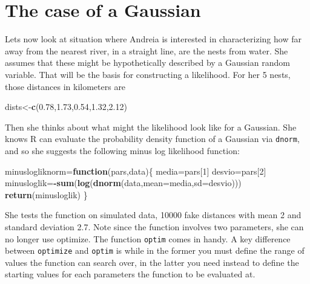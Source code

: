 \documentclass[
]{book}
\newenvironment{Shaded}{\begin{snugshade}}{\end{snugshade}}
\newcommand{\AttributeTok}[1]{\textcolor[rgb]{0.13,0.29,0.53}{#1}}
\newcommand{\ControlFlowTok}[1]{\textcolor[rgb]{0.13,0.29,0.53}{\textbf{#1}}}
\newcommand{\DecValTok}[1]{\textcolor[rgb]{0.00,0.00,0.81}{#1}}
\newcommand{\FloatTok}[1]{\textcolor[rgb]{0.00,0.00,0.81}{#1}}
\newcommand{\FunctionTok}[1]{\textcolor[rgb]{0.13,0.29,0.53}{\textbf{#1}}}
\newcommand{\NormalTok}[1]{#1}
\newcommand{\OtherTok}[1]{\textcolor[rgb]{0.56,0.35,0.01}{#1}}
\newcommand{\SpecialCharTok}[1]{\textcolor[rgb]{0.81,0.36,0.00}{\textbf{#1}}}
\begin{document}
\section{The case of a Gaussian}\label{the-case-of-a-gaussian}

Lets now look at situation where Andreia is interested in characterizing how far away from the nearest river, in a straight line, are the nests from water. She assumes that these might be hypothetically described by a Gaussian random variable. That will be the basis for constructing a likelihood. For her 5 nests, those distances in kilometers are

\begin{Shaded}
\begin{Highlighting}[]
\NormalTok{dists}\OtherTok{\textless{}{-}}\FunctionTok{c}\NormalTok{(}\FloatTok{0.78}\NormalTok{,}\FloatTok{1.73}\NormalTok{,}\FloatTok{0.54}\NormalTok{,}\FloatTok{1.32}\NormalTok{,}\FloatTok{2.12}\NormalTok{)}
\end{Highlighting}
\end{Shaded}

Then she thinks about what might the likelihood look like for a Gaussian. She knows R can evaluate the probability density function of a Gaussian via \texttt{dnorm}, and so she suggests the following minus log likelihood function:

\begin{Shaded}
\begin{Highlighting}[]
\NormalTok{minuslogliknorm}\OtherTok{=}\ControlFlowTok{function}\NormalTok{(pars,data)\{}
\NormalTok{  media}\OtherTok{=}\NormalTok{pars[}\DecValTok{1}\NormalTok{]}
\NormalTok{  desvio}\OtherTok{=}\NormalTok{pars[}\DecValTok{2}\NormalTok{]}
\NormalTok{  minusloglik}\OtherTok{=}\SpecialCharTok{{-}}\FunctionTok{sum}\NormalTok{(}\FunctionTok{log}\NormalTok{(}\FunctionTok{dnorm}\NormalTok{(data,}\AttributeTok{mean=}\NormalTok{media,}\AttributeTok{sd=}\NormalTok{desvio)))}
  \FunctionTok{return}\NormalTok{(minusloglik)}
\NormalTok{\}}
\end{Highlighting}
\end{Shaded}

She tests the function on simulated data, 10000 fake distances with mean 2 and standard deviation 2.7. Note since the function involves two parameters, she can no longer use optimize. The function \texttt{optim} comes in handy. A key difference between \texttt{optimize} and \texttt{optim} is while in the former you must define the range of values the function can search over, in the latter you need instead to define the starting values for each parameters the function to be evaluated at.
\end{document}
